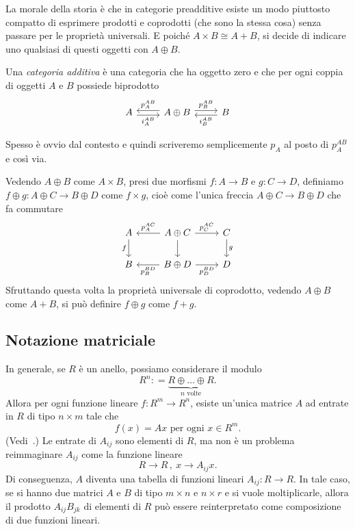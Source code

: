 La morale della storia è che in categorie preadditive esiste un modo
piuttosto compatto di esprimere prodotti e coprodotti (che sono la
stessa cosa) senza passare per le proprietà universali. E poiché
\(A \times B \cong A + B\), si decide di indicare uno qualsiasi di
questi oggetti con \(A \oplus B\).

\begin{definition}
  Una {\em categoria additiva} è una categoria che ha oggetto zero e che
  per ogni coppia di oggetti \(A\) e \(B\) possiede biprodotto
  \[
    \begin{tikzcd}
      A \ar["{i_A^{AB}}", r, shift right, swap] & A \oplus B
      \ar["{p_A^{AB}}", l, shift right, swap] \ar["{p_B^{AB}}", r, shift
      left] & B \ar["{i_B^{AB}}", l, shift left]
    \end{tikzcd}
  \]
\end{definition}

Spesso è ovvio dal contesto e quindi scriveremo semplicemente \(p_A\) al
posto di \(p_A^{AB}\) e così via.

Vedendo \(A \oplus B\) come \(A \times B\), presi due morfismi
\(f : A \to B\) e \(g : C \to D\), definiamo
\(f \oplus g : A \oplus C \to B \oplus D\) come \(f \times g\), cioè
come l'unica freccia \(A \oplus C \to B \oplus D\) che fa commutare
\[
  \begin{tikzcd}
    A \ar["{f}", d, swap] & A \oplus C \ar["{p_A^{AC}}", l, swap]
    \ar["{}", d] \ar["{p_C^{AC}}", r] & C \ar["{g}", d] \\
    B & B \oplus D \ar["{p_B^{BD}}", l] \ar["{p_D^{BD}}", r, swap] & D
  \end{tikzcd}
\]
Sfruttando questa volta la proprietà universale di coprodotto, vedendo
\(A \oplus B\) come \(A + B\), si può definire \(f \oplus g\) come
\(f + g\).


\subsection{Notazione matriciale}

\begin{example}
  In generale, se \(R\) è un anello, possiamo considerare il modulo
  \[
    R^n : = \underbrace{R \oplus \dots{} \oplus R}_{n \text{ volte}}.
  \]
  Allora per ogni funzione lineare \(f : R^m \to R^n\), esiste un'unica
  matrice \(A\) ad entrate in \(R\) di tipo \(n \times m\) tale che
  \[
    f(x) = A x \text{ per ogni } x \in R^m .
  \]
  (Vedi~\cite{aluffi:algebra}.) Le entrate di \(A_{ij}\) sono elementi
  di \(R\), ma non è un problema reimmaginare \(A_{ij}\) come la
  funzione lineare
  \[
    R \to R\,,\ x \to A_{ij}x .
  \]
  Di conseguenza, \(A\) diventa una tabella di funzioni lineari
  \(A_{ij} : R \to R\). In tale caso, se si hanno due matrici \(A\) e
  \(B\) di tipo \(m \times n\) e \(n \times r\) e si vuole
  moltiplicarle, allora il prodotto \(A_{ij} B_{jk}\) di elementi di
  \(R\) può essere reinterpretato come composizione di due funzioni
  lineari.
\end{example}

